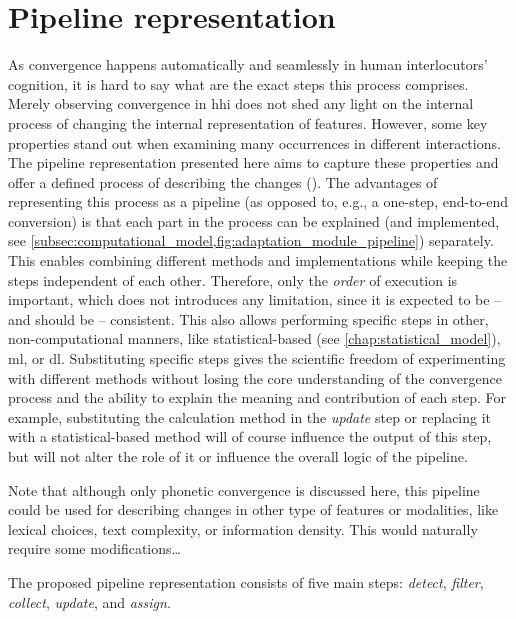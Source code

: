 \section{Pipeline representation}
\label{sec:pipeline_representation}

As convergence happens automatically and seamlessly in human interlocutors' cognition, it is hard to say what are the exact steps this process comprises.
Merely observing convergence in \ac{hhi} does not shed any light on the internal process of changing the internal representation of features.
However, some key properties stand out when examining many occurrences in different interactions.
The pipeline representation presented here aims to capture these properties and offer a defined process of describing the changes ().
The advantages of representing this process as a pipeline (as opposed to, e.g., a one-step, end-to-end conversion) is that each part in the process can be explained (and implemented, see \cref{subsec:computational_model,fig:adaptation_module_pipeline}) separately.
This enables combining different methods and implementations while keeping the steps independent of each other.
Therefore, only the \emph{order} of execution is important, which does not introduces any limitation, since it is expected to be -- and should be -- consistent.
This also allows performing specific steps in other, non-computational manners, like statistical-based (see \cref{chap:statistical_model}), \ac{ml}, or \ac{dl}.
Substituting specific steps gives the scientific freedom of experimenting with different methods without losing the core understanding of the convergence process and the ability to explain the meaning and contribution of each step.
For example, substituting the calculation method in the \textit{update} step or replacing it with a statistical-based method will of course influence the output of this step, but will not alter the role of it or influence the overall logic of the pipeline.

Note that although only phonetic convergence is discussed here, this pipeline could be used for describing changes in other type of features or modalities, like lexical choices, text complexity, or information density.
This would naturally require some modifications\ldots

The proposed pipeline representation consists of five main steps: \emph{detect}, \emph{filter}, \emph{collect}, \emph{update}, and \emph{assign}.

